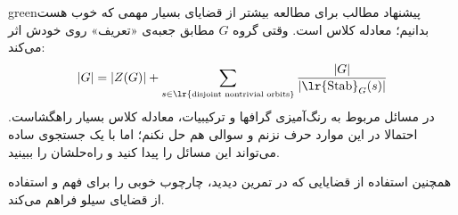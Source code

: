 \documentclass{article}
\begin{document}
\begin{boxes}{green}{پیشنهاد مطالب برای مطالعه بیشتر}
	از قضایای بسیار مهمی که خوب هست بدانیم؛ معادله کلاس
	است. وقتی گروه $G$ مطابق جعبه‌ی «تعریف» روی خودش اثر می‌کند:
	\[
	|G| = |Z(G)| + \sum_{s \in \text{\lr{\tiny disjoint nontrivial orbits}}} \frac{|G|}{|\text{\lr{Stab}}_G(s)|}
	\]
	در مسائل مربوط به رنگ‌آمیزی گرافها و ترکیبیات، معادله کلاس بسیار راهگشاست. احتمالا در این موارد حرف نزنم و سوالی هم حل نکنم؛ اما با یک جستجوی ساده می‌تواند این مسائل را پیدا کنید و راه‌حلشان را ببینید.
	
	همچنین استفاده از قضایایی که در تمرین دیدید، چارچوب خوبی را برای فهم و استفاده از قضایای سیلو فراهم می‌کند.
\end{boxes}
 
\end{document}
